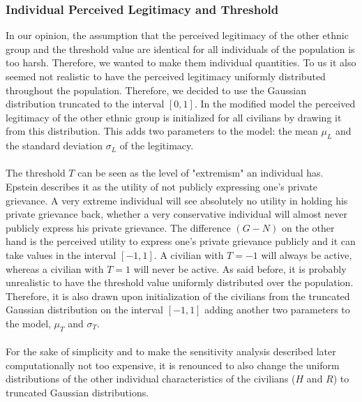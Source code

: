 \documentclass[11pt]{article}
\begin{document}
\subsubsection{Individual Perceived Legitimacy and Threshold}
In our opinion, the assumption that the perceived legitimacy of the other ethnic group and the threshold value are identical for all individuals of the population is too harsh. Therefore, we wanted to make them individual quantities. To us it also seemed not realistic to have the perceived legitimacy uniformly distributed throughout the population. Therefore, we decided to use the Gaussian distribution truncated to the interval $[0,1]$. In the modified model the perceived legitimacy of the other ethnic group is initialized for all civilians by drawing it from this distribution. This adds two parameters to the model: the mean $\mu_L$ and the standard deviation $\sigma_L$ of the legitimacy.\\
\\
The threshold $T$ can be seen as the level of "extremism" an individual has. Epstein describes it as the utility of not publicly expressing one's private grievance. A very extreme individual will see absolutely no utility in holding his private grievance back, whether a very conservative individual will almost never publicly express his private grievance. The difference $(G-N)$ on the other hand is the perceived utility to express one's private grievance publicly and it can take values in the interval $[-1,1]$. A civilian with $T = -1$ will always be active, whereas a civilian with $T = 1$ will never be active. As said before, it is probably unrealistic to have the threshold value uniformly distributed over the population. Therefore, it is also drawn upon initialization of the civilians from the truncated Gaussian distribution on the interval $[-1,1]$ adding another two parameters to the model, $\mu_T$ and $\sigma_T$.\\
\\
For the sake of simplicity and to make the sensitivity analysis described later computationally not too expensive, it is renounced to also change the uniform distributions of the other individual characteristics of the civilians ($H$ and $R$) to truncated Gaussian distributions.
\end{document}
